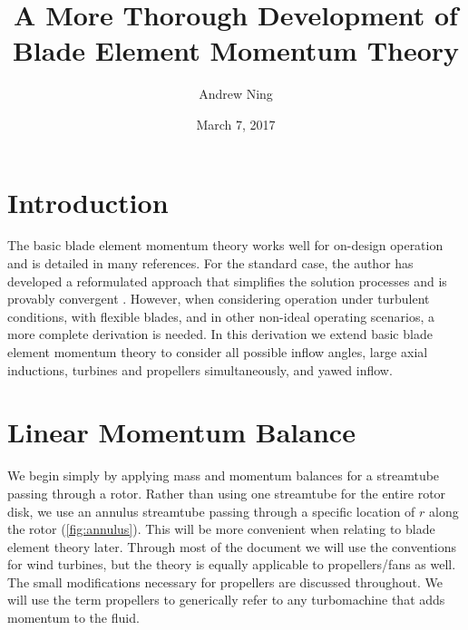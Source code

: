 \documentclass{article}
\begin{document}
\author{Andrew Ning}
\title{A More Thorough Development of\\Blade Element Momentum Theory}
\date{March 7, 2017}
\maketitle

\section{Introduction}

The basic blade element momentum theory works well for on-design operation and is detailed in many references.  For the standard case, the author has developed a reformulated approach that simplifies the solution processes and is provably convergent \cite{Ning2014-Simple-Solution}.  However, when considering operation under turbulent conditions, with flexible blades, and in other non-ideal operating scenarios, a more complete derivation is needed.  In this derivation we extend basic blade element momentum theory to consider all possible inflow angles, large axial inductions, turbines and propellers simultaneously, and yawed inflow.

\section{Linear Momentum Balance}

We begin simply by applying mass and momentum balances for a streamtube passing through a rotor.  Rather than using one streamtube for the entire rotor disk, we use an annulus streamtube passing through a specific location of $r$ along the rotor (\cref{fig:annulus}). This will be more convenient when relating to blade element theory later.  Through most of the document we will use the conventions for wind turbines, but the theory is equally applicable to propellers/fans as well.  The small modifications necessary for propellers are discussed throughout.  We will use the term propellers to generically refer to any turbomachine that adds momentum to the fluid.
\end{document}
